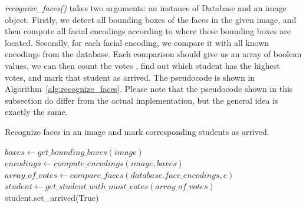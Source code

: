 \emph{recognize\_faces()} takes two arguments: an instance of Database and an image object.
Firstly, we detect all bounding boxes of the faces in the given image, and then
compute all facial encodings according to where these bounding boxes are located.
Secondly, for each facial encoding, we compare it with all known encodings from the database.
Each comparison should give us an array of boolean values, we can then count the votes
, find out which student has the highest votes, and mark that student as arrived.
The pseudocode is shown in Algorithm~\ref{alg:recognize_faces}.
Please note that the pseudocode shown in this subsection do differ from the actual implementation,
but the general idea is exactly the same.
\vspace{0.2cm}

\begin{algorithm}
  \caption{Recognize faces in an image and mark corresponding students as arrived.}
  \label{alg:recognize_faces}
  \begin{algorithmic}
      \State $boxes \leftarrow get\_bounding\_boxes(image)$
      \State $encodings \leftarrow compute\_encodings(image, boxes)$
      \State 
        \State $array\_of\_votes \leftarrow compare\_faces(database.face\_encodings, e)$
        \State  $student \leftarrow get\_student\_with\_most\_votes(array\_of\_votes)$
        \State student.set\_arrived(True)
      \EndFor
    \EndProcedure
  \end{algorithmic}
\end{algorithm}
\vspace{0.5cm}
